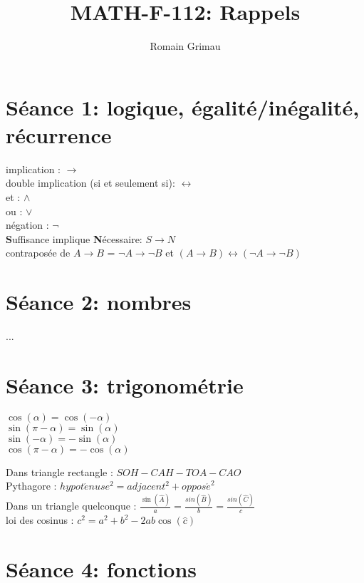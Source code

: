 \documentclass[12pt]{article}
\title{\textbf{MATH-F-112: Rappels}}
\author{Romain Grimau}
\date{}
\begin{document}
\maketitle

\section*{S\'eance 1: logique, \'egalit\'e/in\'egalit\'e, r\'ecurrence}

implication : $\rightarrow$ \\
\indent double implication (si et seulement si): $\leftrightarrow$ \\
\indent et : $\land$ \\
\indent ou : $\lor$ \\
\indent n\'egation : $\lnot$ \\
\indent \textbf{S}uffisance implique \textbf{N}\'ecessaire: $S \rightarrow N$ \\
\indent contrapos\'ee de $A \rightarrow B$ = $\lnot A \rightarrow \lnot B$ et $(A\rightarrow B) \leftrightarrow (\lnot A \rightarrow \lnot B)$

\section*{S\'eance 2: nombres}

...

\section*{S\'eance 3: trigonom\'etrie}

\begin{multicols}{2}
$\cos(\alpha) = \cos(-\alpha)$\\
\indent$\sin(\pi - \alpha) = \sin(\alpha)$ \\
$\sin(-\alpha) = -\sin(\alpha)$ \\
$\cos(\pi - \alpha) = - \cos(\alpha)$
\end{multicols}
Dans triangle rectangle : $SOH - CAH - TOA - CAO$ \\ 
\indent Pythagore : $ hypot\acute enuse^{2} = adjacent^{2} + oppos\acute e^{2}$ \\
\indent Dans un triangle quelconque : $\frac{\sin(\hat{A})}{a} = \frac{sin(\hat{B})}{b} = \frac{sin(\hat{C})}{c}$ \\ 
\indent loi des cosinus : $c^{2} = a^{2}+b^{2} - 2ab\cos(\hat{c})$

\section*{S\'eance 4: fonctions}
\end{document}
